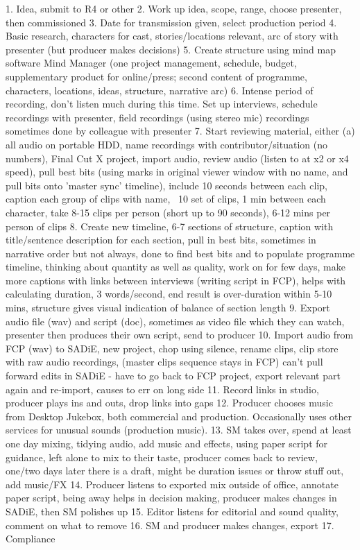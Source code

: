 1. Idea, submit to R4 or other
2. Work up idea, scope, range, choose presenter, then commissioned
3. Date for transmission given, select production period
4. Basic research, characters for cast, stories/locations relevant, arc of
story with presenter (but producer makes decisions)
5. Create structure using mind map software Mind Manager (one project
management, schedule, budget, supplementary product for online/press; second
content of programme, characters, locations, ideas, structure, narrative arc)
6. Intense period of recording, don't listen much during this time. Set up
interviews, schedule recordings with presenter, field recordings (using stereo
mic) recordings sometimes done by colleague with presenter
7. Start reviewing material, either (a) all audio on portable HDD, name
recordings with contributor/situation (no numbers), Final Cut X project, import
audio, review audio (listen to at x2 or x4 speed), pull best bits (using marks
in original viewer window with no name, and pull bits onto 'master sync'
timeline), include 10 seconds between each clip, caption each group of clips
with name, ~10 set of clips, 1 min between each character, take 8-15 clips per
person (short up to 90 seconds), 6-12 mins per person of clips
8. Create new timeline, 6-7 sections of structure, caption with title/sentence
description for each section, pull in best bits, sometimes in narrative order
but not always, done to find best bits and to populate programme timeline,
thinking about quantity as well as quality, work on for few days, make more
captions with links between interviews (writing script in FCP), helps with
calculating duration, 3 words/second, end result is over-duration within 5-10
mins, structure gives visual indication of balance of section length
9. Export audio file (wav) and script (doc), sometimes as video file which they
can watch, presenter then produces their own script, send to producer
10. Import audio from FCP (wav) to SADiE, new project, chop using silence,
rename clips, clip store with raw audio recordings, (master clips sequence
stays in FCP) can't pull forward edits in SADiE - have to go back to FCP
project, export relevant part again and re-import, causes to err on long side
11. Record links in studio, producer plays ins and outs, drop links into gaps
12. Producer chooses music from Desktop Jukebox, both commercial and
production. Occasionally uses other services for unusual sounds (production
music). 
13. SM takes over, spend at least one day mixing, tidying audio, add music and
effects, using paper script for guidance, left alone to mix to their taste,
producer comes back to review, one/two days later there is a draft, might be
duration issues or throw stuff out, add music/FX
14. Producer listens to exported mix outside of office, annotate paper script,
being away helps in decision making, producer makes changes in SADiE, then SM
polishes up
15. Editor listens for editorial and sound quality, comment on what to remove
16. SM and producer makes changes, export
17. Compliance

